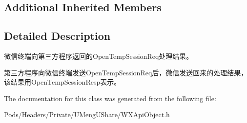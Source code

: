 \subsection*{Additional Inherited Members}


\subsection{Detailed Description}
微信终端向第三方程序返回的\+Open\+Temp\+Session\+Req处理结果。 

第三方程序向微信终端发送\+Open\+Temp\+Session\+Req后，微信发送回来的处理结果，该结果用\+Open\+Temp\+Session\+Resp表示。 

The documentation for this class was generated from the following file\+:\begin{DoxyCompactItemize}
\item 
Pods/\+Headers/\+Private/\+U\+Meng\+U\+Share/W\+X\+Api\+Object.\+h\end{DoxyCompactItemize}
